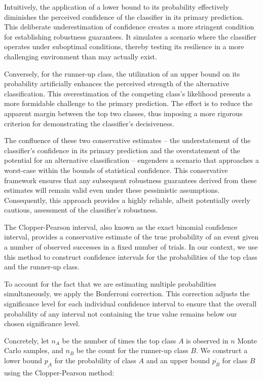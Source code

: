 Intuitively, the application of a lower bound to its probability effectively diminishes the perceived confidence of the classifier in its primary prediction.
This deliberate underestimation of confidence creates a more stringent condition for establishing robustness guarantees.
It simulates a scenario where the classifier operates under suboptimal conditions, thereby testing its resilience in a more challenging environment than may actually exist.

Conversely, for the runner-up class, the utilization of an upper bound on its probability artificially enhances the perceived strength of the alternative classification.
This overestimation of the competing class's likelihood presents a more formidable challenge to the primary prediction.
The effect is to reduce the apparent margin between the top two classes, thus imposing a more rigorous criterion for demonstrating the classifier's decisiveness.

The confluence of these two conservative estimates – the understatement of the classifier's confidence in its primary prediction and the overstatement of the potential for an alternative classification – engenders a scenario that approaches a worst-case within the bounds of statistical confidence.
This conservative framework ensures that any subsequent robustness guarantees derived from these estimates will remain valid even under these pessimistic assumptions.
Consequently, this approach provides a highly reliable, albeit potentially overly cautious, assessment of the classifier's robustness.

The Clopper-Pearson interval, also known as the exact binomial confidence interval, provides a conservative estimate of the true probability of an event given a number of observed successes in a fixed number of trials.
In our context, we use this method to construct confidence intervals for the probabilities of the top class and the runner-up class.

To account for the fact that we are estimating multiple probabilities simultaneously, we apply the Bonferroni correction.
This correction adjusts the significance level for each individual confidence interval to ensure that the overall probability of any interval not containing the true value remains below our chosen significance level.

Concretely, let $n_A$ be the number of times the top class $A$ is observed in $n$ Monte Carlo samples, and $n_B$ be the count for the runner-up class $B$.
We construct a lower bound $\underline{p_A}$ for the probability of class $A$ and an upper bound $\overline{p_B}$ for class $B$ using the Clopper-Pearson method:


